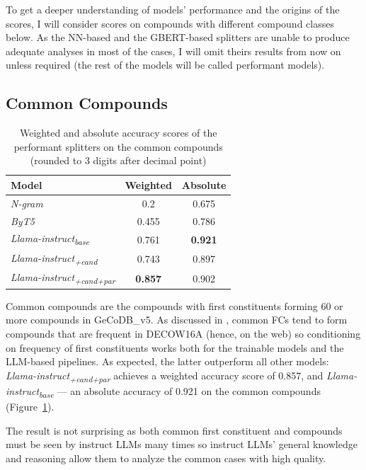 \documentclass[11pt]{article}
\begin{document}
To get a deeper understanding of models' performance and the origins of the scores, I will consider scores on compounds with different compound classes below. As the NN-based and the GBERT-based splitters are unable to produce adequate analyses in most of the cases, I will omit theirs results from now on unless required (the rest of the models will be called performant models).


\subsection{Common Compounds}

\begin{table}[htb!]
    \centering
    \begin{tabular}{@{}lcc@{}}
        \toprule
        Model & Weighted & Absolute \\ \midrule
        \textit{N-gram} & 0.2 & 0.675 \\ \cmidrule{1-3}
        \textit{ByT5} & 0.455 & 0.786 \\ \midrule
        \textit{Llama-instruct\textsubscript{base}}  & 0.761 & \textbf{0.921} \\
        \textit{Llama-instruct\textsubscript{+cand}} & 0.743 & 0.897 \\
        \textit{Llama-instruct\textsubscript{+cand+par}} & \textbf{0.857} & 0.902 \\ 
        \bottomrule
    \end{tabular}
    \caption{Weighted and absolute accuracy scores of the performant splitters on the common compounds (rounded to 3 digits after decimal point)}
    \label{tab:common_scores}
\end{table}

Common compounds are the compounds with first constituents forming 60 or more compounds in GeCoDB\_v5. As discussed in , common FCs tend to form compounds that are frequent in DECOW16A (hence, on the web) so conditioning on frequency of first constituents works both for the trainable models and the LLM-based pipelines. As expected, the latter outperform all other models: \textit{Llama-instruct\textsubscript{+cand+par}} achieves a weighted accuracy score of 0.857, and \textit{Llama-instruct\textsubscript{base}} --- an absolute accuracy of 0.921 on the common compounds (Figure~\ref{tab:common_scores}).

The result is not surprising as both common first constituent and compounds must be seen by instruct LLMs many times so instruct LLMs' general knowledge and reasoning allow them to analyze the common cases with high quality.
\end{document}
